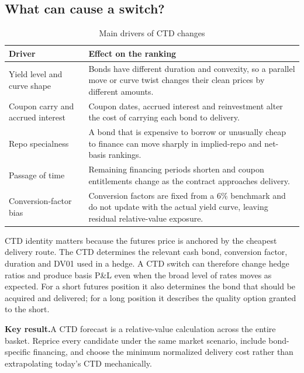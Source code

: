 \documentclass[11pt]{article}
\newcommand{\keynote}[1]{\par\medskip\noindent\textbf{\sffamily\color{NYUviolet}Key result.}\enspace #1\par\medskip}
\numberwithin{equation}{section}
\begin{document}
\subsection{What can cause a switch?}
\begin{table}[H]
\centering
\caption{Main drivers of CTD changes}
\small
\begin{tabularx}{\textwidth}{@{}L{3.2cm}Y@{}}
\toprule{}\textbf{Driver} & \textbf{Effect on the ranking}\\\midrule
Yield level and curve shape & Bonds have different duration and convexity, so a parallel move or curve twist changes their clean prices by different amounts.\\
Coupon carry and accrued interest & Coupon dates, accrued interest and reinvestment alter the cost of carrying each bond to delivery.\\
Repo specialness & A bond that is expensive to borrow or unusually cheap to finance can move sharply in implied-repo and net-basis rankings.\\
Passage of time & Remaining financing periods shorten and coupon entitlements change as the contract approaches delivery.\\
Conversion-factor bias & Conversion factors are fixed from a 6\% benchmark and do not update with the actual yield curve, leaving residual relative-value exposure.\\
\bottomrule
\end{tabularx}
\end{table}

CTD identity matters because the futures price is anchored by the cheapest
delivery route. The CTD determines the relevant cash bond, conversion factor,
duration and DV01 used in a hedge. A CTD switch can therefore change hedge
ratios and produce basis P\&L even when the broad level of rates moves as
expected. For a short futures position it also determines the bond that should
be acquired and delivered; for a long position it describes the quality option
granted to the short.

\keynote{A CTD forecast is a relative-value calculation across the entire
basket. Reprice every candidate under the same market scenario, include
bond-specific financing, and choose the minimum normalized delivery cost rather
than extrapolating today's CTD mechanically.}

\clearpage
\end{document}
